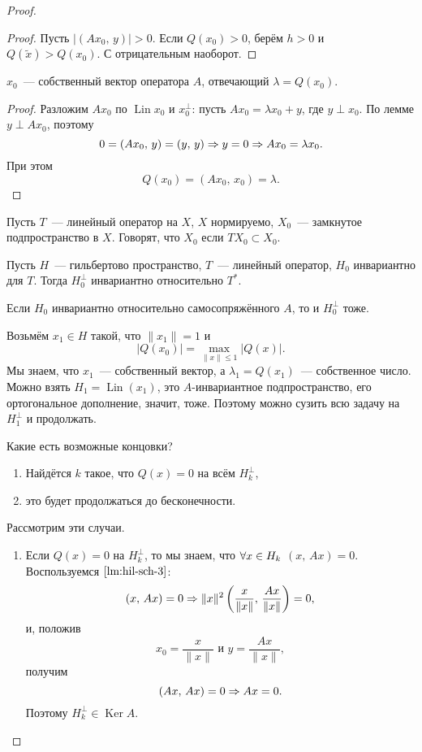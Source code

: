 \documentclass{notes}
\DeclareMathOperator{\Ker}{Ker}
\DeclareMathOperator{\Lin}{Lin}
\begin{document}
\begin{thm}
\begin{proof}
\begin{lm}
\begin{proof}
					Пусть $\big|(Ax_0, \, y)\big| > 0$. Если $Q(x_0) > 0$, берём $h > 0$ и $Q(\tilde{x}) > Q(x_0)$. С отрицательным наоборот.
				\end{proof}
			\end{lm}

			\begin{cor}
				$x_0$~--- собственный вектор оператора $A$, отвечающий $\lambda = Q(x_0)$.
				\begin{proof}
					Разложим $Ax_0$ по $\Lin{x_0}$ и $x_0^{\perp}$: пусть $Ax_0 = \lambda x_0 + y$, где $y \perp x_0$. По лемме $y \perp Ax_0$, поэтому
					\[
						0 = (Ax_0, \, y) = (y, \, y) \Rightarrow y = 0 \Rightarrow Ax_0 = \lambda x_0.
					\]  
					При этом
					\[
						Q(x_0) = (Ax_0, \, x_0) = \lambda.
					\]
				\end{proof}
			\end{cor}

			\begin{de}
				Пусть $T$~--- линейный оператор на $X$, $X$ нормируемо, $X_0$~--- замкнутое подпространство в $X$. Говорят, что $X_0$  если $TX_0 \subset X_0$.
			\end{de}

			\begin{st}
				Пусть $H$~--- гильбертово пространство, $T$~--- линейный оператор, $H_0$ инвариантно для $T$. Тогда $H_0^{\perp}$ инвариантно относительно $T^*$.
			\end{st}
			\begin{cor}
				Если $H_0$ инвариантно относительно самосопряжённого $A$, то и $H_0^{\perp}$ тоже.
			\end{cor}

			Возьмём $x_1 \in H$ такой, что $\|x_1\| = 1$ и 
			\[
				\big|Q(x_0)\big| = \max\limits_{\|x\| \leqslant 1} \big|Q(x)\big|.
			\]
			Мы знаем, что $x_1$~--- собственный вектор, а $\lambda_1 = Q(x_1)$~--- собственное число. Можно взять $H_1 = \Lin(x_1)$, это $A$-инвариантное подпространство, его ортогональное дополнение, значит, тоже. Поэтому можно сузить всю задачу на $H_1^{\perp}$ и продолжать.

			Какие есть возможные концовки?
			\begin{enumerate}
				\item Найдётся $k$ такое, что $Q(x) = 0$ на всём $H_k^{\perp}$,
				\item это будет продолжаться до бесконечности.
			\end{enumerate}

			Рассмотрим эти случаи.
			\begin{enumerate}
				\item Если $Q(x) = 0$ на $H_k^{\perp}$, то мы знаем, что $\forall x \in H_k$ $(x, \, Ax) = 0$. Воспользуемся $\ref{lm:hil-sch-3}$:
				\[
					(x, \, Ax) = 0 \Rightarrow \|x\|^2 \left(
					\dfrac{x}{\|x\|}, \,\dfrac{Ax}{\|x\|} \right) = 0,
				\]
				и, положив 
				\[
					x_0 = \dfrac{x}{\|x\|} \text{ и } y = \dfrac{Ax}{\|x\|},
				\]
				получим
				\[
					(Ax, \, Ax) = 0 \Rightarrow Ax = 0.
				\]
				Поэтому $H_k^{\perp} \in \Ker A$.


\end{enumerate}
\end{proof}
\end{thm}
\end{document}
